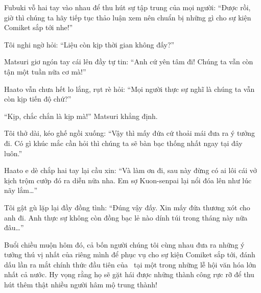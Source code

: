 \documentclass[../main.tex]{subfiles}
\begin{document}
Fubuki vỗ hai tay vào nhau để thu hút sự tập trung của mọi người:
``Được rồi, giờ thì chúng ta hãy tiếp tục thảo luận xem nên chuẩn bị những gì cho sự kiện Comiket sắp tới nhe!''

Tôi nghi ngờ hỏi:
``Liệu còn kịp thời gian không đấy?''

Matsuri giơ ngón tay cái lên đầy tự tin:
``Anh cứ yên tâm đi! Chúng ta vẫn còn tận một tuần nữa cơ mà!''

Haato vẫn chưa hết lo lắng, rụt rè hỏi:
``Mọi người thực sự nghĩ là chúng ta vẫn còn kịp tiến độ chứ?''

``Kịp, chắc chắn là kịp mà!'' Matsuri khẳng định.

Tôi thở dài, kéo ghế ngồi xuống:
``Vậy thì mấy đứa cứ thoải mái đưa ra ý tưởng đi. Có gì khúc mắc cần hỏi thì chúng ta sẽ bàn bạc thống nhất ngay tại đây luôn.''

Haato e dè chắp hai tay lại cầu xin:
``Và làm ơn đi, sau này đừng có ai lôi cái vở kịch trộm cướp đó ra diễn nữa nha. Em sợ Kuon-senpai lại nổi đóa lên như lúc nãy lắm\dots''

Tôi gật gù lặp lại đầy đồng tình:
``Đúng vậy đấy. Xin mấy đứa thương xót cho anh đi. Anh thực sự không còn đồng bạc lẻ nào dính túi trong tháng này nữa đâu\dots''

Buổi chiều muộn hôm đó, cả bốn người chúng tôi cùng nhau đưa ra những ý tưởng thú vị nhất của riêng mình để phục vụ cho sự kiện Comiket sắp tới, đánh dấu lần ra mắt chính thức đầu tiên của \hll\ tại một trong những lễ hội văn hóa lớn nhất cả nước. Hy vọng rằng họ sẽ gặt hái được những thành công rực rỡ để thu hút thêm thật nhiều người hâm mộ trung thành!
\end{document}
